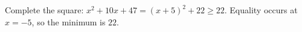 Complete the square: $x^2+10x+47=(x+5)^2+22\ge22$. Equality occurs at $x=-5$, so the minimum is $\boxed{22}$.
